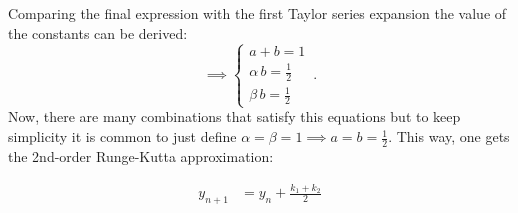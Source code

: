 \documentclass[class={myRUCProject}, crop=false]{standalone}
\begin{document}
Comparing the final expression with the first Taylor series expansion the value of the constants can be derived:
\begin{equation}
\implies
    \begin{cases}
      a+b = 1\\
      \alpha \, b = \frac{1}{2} \\
       \beta \, b = \frac{1}{2}
    \end{cases}\,.
\end{equation}
Now, there are many combinations that satisfy this equations but to keep simplicity it is common to just define $\alpha = \beta = 1 \implies a= b= \frac{1}{2}$. This way, one gets the 2nd-order Runge-Kutta approximation:

\begin{align}
    y_{n+1}  &= y_{n} + \frac{k_1 + k_2}{2} 
\end{align}
\end{document}
